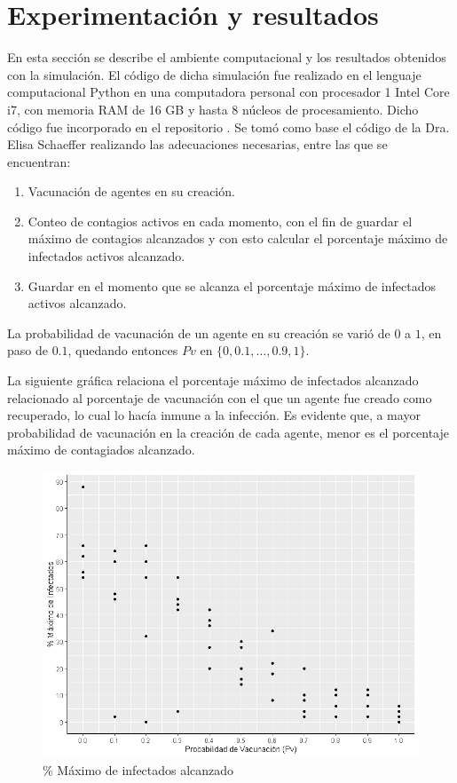 \documentclass{article}
\begin{document}
\section{Experimentación y resultados}
En esta sección se describe el ambiente computacional y los resultados obtenidos con la simulación. El código de dicha simulación fue realizado en el lenguaje computacional Python en una computadora personal con procesador 1 Intel Core i7, con memoria RAM de 16 GB y hasta 8 núcleos de procesamiento. Dicho código fue incorporado en el repositorio \cite{p_6}.  Se tomó como base el código de la Dra. Elisa Schaeffer realizando las adecuaciones necesarias, entre las que se encuentran:
\begin{enumerate}

\item Vacunación de agentes en su creación.
\item Conteo de contagios activos en cada momento, con el fin de guardar el máximo de contagios alcanzados y con esto calcular el porcentaje máximo de infectados activos alcanzado. 
\item Guardar en el momento que se alcanza el  porcentaje máximo de infectados activos alcanzado.
	
\end{enumerate}

La probabilidad de vacunación de un agente en su creación se varió de $0$ a $1$, en paso de $0.1$, quedando entonces $Pv$ en $\{0, 0.1, …, 0.9, 1\}$. 

La siguiente gráfica relaciona el porcentaje máximo de infectados alcanzado relacionado al porcentaje de vacunación con el que un agente fue creado como recuperado, lo cual lo hacía inmune a la infección. Es evidente que, a mayor probabilidad de vacunación en la creación de cada agente, menor es el porcentaje máximo de contagiados alcanzado.

\begin{figure}[h]
	\centering
	\includegraphics[width=0.6\linewidth]{Rplot1}
	\caption{\% Máximo de infectados alcanzado}
	\label{fig:imagen1}
\end{figure}
\end{document}
